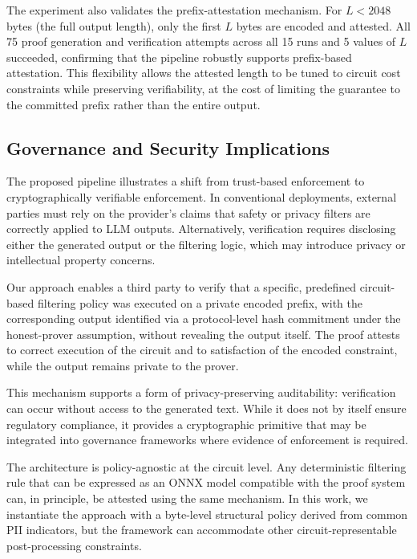 \documentclass[10pt,conference,a4paper]{IEEEtran}
\begin{document}
The experiment also validates the prefix-attestation mechanism. For $L < 2048$ bytes (the full output length), only the first $L$ bytes are encoded and attested. All 75 proof generation and verification attempts across all 15 runs and 5 values of $L$ succeeded, confirming that the pipeline robustly supports prefix-based attestation. This flexibility allows the attested length to be tuned to circuit cost constraints while preserving verifiability, at the cost of limiting the guarantee to the committed prefix rather than the entire output.

\subsection{Governance and Security Implications}

The proposed pipeline illustrates a shift from trust-based enforcement to cryptographically verifiable enforcement. In conventional deployments, external parties must rely on the provider’s claims that safety or privacy filters are correctly applied to LLM outputs. Alternatively, verification requires disclosing either the generated output or the filtering logic, which may introduce privacy or intellectual property concerns.

Our approach enables a third party to verify that a specific, predefined circuit-based filtering policy was executed on a private encoded prefix, with the corresponding output identified via a protocol-level hash commitment under the honest-prover assumption, without revealing the output itself.
The proof attests to correct execution of the circuit and to satisfaction of the encoded constraint, while the output remains private to the prover.

This mechanism supports a form of privacy-preserving auditability: verification can occur without access to the generated text. While it does not by itself ensure regulatory compliance, it provides a cryptographic primitive that may be integrated into governance frameworks where evidence of enforcement is required.

The architecture is policy-agnostic at the circuit level. Any deterministic filtering rule that can be expressed as an ONNX model compatible with the proof system can, in principle, be attested using the same mechanism. In this work, we instantiate the approach with a byte-level structural policy derived from common PII indicators, but the framework can accommodate other circuit-representable post-processing constraints.
\end{document}
